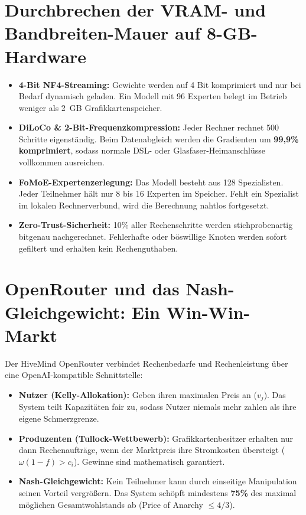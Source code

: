 \documentclass[11pt,a4paper]{report}
\begin{document}
\section{Durchbrechen der VRAM- und Bandbreiten-Mauer auf 8-GB-Hardware}
\begin{itemize}[leftmargin=1.8em]
    \item \textbf{4-Bit NF4-Streaming:} Gewichte werden auf 4 Bit komprimiert und nur bei Bedarf dynamisch geladen. Ein Modell mit 96 Experten belegt im Betrieb weniger als 2~GB Grafikkartenspeicher.
    \item \textbf{DiLoCo \& 2-Bit-Frequenzkompression:} Jeder Rechner rechnet 500 Schritte eigenständig. Beim Datenabgleich werden die Gradienten um \textbf{99,9\% komprimiert}, sodass normale DSL- oder Glasfaser-Heimanschlüsse vollkommen ausreichen.
    \item \textbf{FoMoE-Expertenzerlegung:} Das Modell besteht aus 128 Spezialisten. Jeder Teilnehmer hält nur 8 bis 16 Experten im Speicher. Fehlt ein Spezialist im lokalen Rechnerverbund, wird die Berechnung nahtlos fortgesetzt.
    \item \textbf{Zero-Trust-Sicherheit:} 10\% aller Rechenschritte werden stichprobenartig bitgenau nachgerechnet. Fehlerhafte oder böswillige Knoten werden sofort gefiltert und erhalten kein Rechenguthaben.
\end{itemize}

\section{OpenRouter und das Nash-Gleichgewicht: Ein Win-Win-Markt}
Der HiveMind OpenRouter verbindet Rechenbedarfe und Rechenleistung über eine OpenAI-kompatible Schnittstelle:
\begin{itemize}[leftmargin=1.8em]
    \item \textbf{Nutzer (Kelly-Allokation):} Geben ihren maximalen Preis an ($v_j$). Das System teilt Kapazitäten fair zu, sodass Nutzer niemals mehr zahlen als ihre eigene Schmerzgrenze.
    \item \textbf{Produzenten (Tullock-Wettbewerb):} Grafikkartenbesitzer erhalten nur dann Rechenaufträge, wenn der Marktpreis ihre Stromkosten übersteigt ($\omega(1-f) > c_i$). Gewinne sind mathematisch garantiert.
    \item \textbf{Nash-Gleichgewicht:} Kein Teilnehmer kann durch einseitige Manipulation seinen Vorteil vergrößern. Das System schöpft mindestens \textbf{75\%} des maximal möglichen Gesamtwohlstands ab (Price of Anarchy $\le 4/3$).
\end{itemize}
\end{document}
